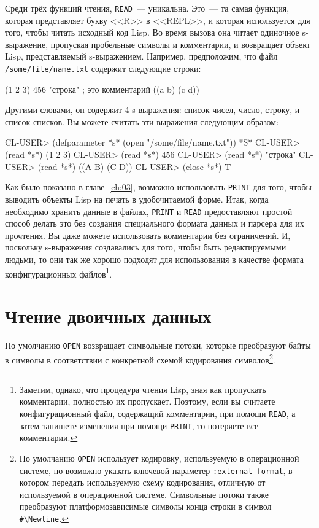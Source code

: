 Среди трёх функций чтения, \lstinline{READ}~--- уникальна. Это~--- та самая функция, которая
представляет букву <<R>> в <<REPL>>, и которая используется для того, чтобы читать исходный
код Lisp. Во время вызова она читает одиночное s-выражение, пропуская пробельные символы и
комментарии, и возвращает объект Lisp, представляемый s-выражением. Например, предположим,
что файл \lstinline{/some/file/name.txt} содержит следующие строки:

\begin{myverb}
(1 2 3)
456
"строка" ; это комментарий
((a b)
 (c d))
\end{myverb}

Другими словами, он содержит 4 s-выражения: список чисел, число, строку, и список
списков. Вы можете считать эти выражения следующим образом:

\begin{myverb}
CL-USER> (defparameter *s* (open "/some/file/name.txt"))
*S*
CL-USER> (read *s*)
(1 2 3)
CL-USER> (read *s*)
456
CL-USER> (read *s*)
"строка"
CL-USER> (read *s*)
((A B) (C D))
CL-USER> (close *s*)
T
\end{myverb}

Как было показано в главе~\ref{ch:03}, возможно использовать \lstinline{PRINT} для того, чтобы выводить
объекты Lisp на печать в удобочитаемой форме. Итак, когда необходимо хранить данные в
файлах, \lstinline{PRINT} и \lstinline{READ} предоставляют простой способ делать это без создания
специального формата данных и парсера для их прочтения. Вы даже можете использовать
комментарии без ограничений. И, поскольку s-выражения создавались для того, чтобы быть
редактируемыми людьми, то они так же хорошо подходят для использования в качестве формата
конфигурационных файлов\footnote{Заметим, однако, что процедура чтения Lisp, зная как
  пропускать комментарии, полностью их пропускает. Поэтому, если вы считаете
  конфигурационный файл, содержащий комментарии, при помощи \lstinline{READ}, а затем запишете
  изменения при помощи \lstinline{PRINT}, то потеряете все комментарии.}\hspace{\footnotenegspace}.

\section{Чтение двоичных данных}

По умолчанию \lstinline{OPEN} возвращает символьные потоки, которые преобразуют байты в символы
в соответствии с конкретной схемой кодирования символов\footnote{По умолчанию \lstinline{OPEN}
  использует кодировку, используемую в операционной системе, но возможно указать ключевой
  параметер \lstinline{:external-format}, в котором передать используемую схему кодирования,
  отличную от используемой в операционной системе. Символьные потоки также преобразуют
  платформозависимые символы конца строки в символ \lstinline!#\Newline!.}\hspace{\footnotenegspace}.

